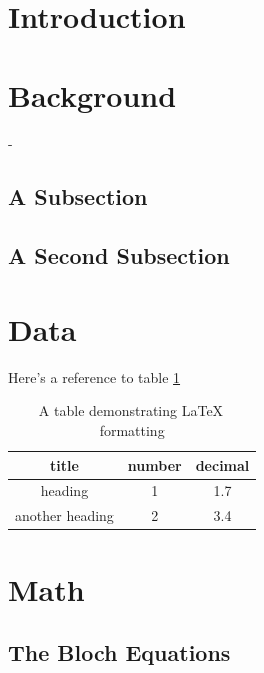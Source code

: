\documentclass{workreport}
\begin{document}
\begin{body}
\section{Introduction}

\lipsum[1-6]

\section{Background}

\lipsum[1-2]-

	\subsection{A Subsection}

	\lipsum[1]

	\subsection{A Second Subsection}

	\lipsum[2]

\section{Data}

\lipsum[1-2]

Here's a reference to table \ref{tbl:exampletable}

\begin{table}
	\centering
	\begin{tabular}{|c|c|c|} \hline
		title & number & decimal \\ \hline
		heading & 1 & 1.7 \\ \hline
		another heading & 2 & 3.4 \\ \hline
	\end{tabular}
	\caption{A table demonstrating \LaTeX \, formatting}
	\label{tbl:exampletable}
\end{table}

\section{Math}

\lipsum[1]

\subsection{The Bloch Equations}


\end{body}
\end{document}
